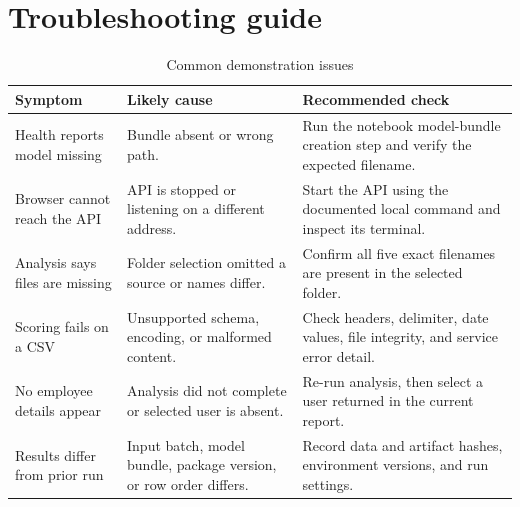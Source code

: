 \section{Troubleshooting guide}
\begin{table}[H]
\centering
\tablefont
\caption{Common demonstration issues}
\label{tab:troubleshooting}
\begin{tabularx}{\textwidth}{|p{}|p{}|Y|}
\hline
\textbf{Symptom} & \textbf{Likely cause} & \textbf{Recommended check}\\\hline
Health reports model missing & Bundle absent or wrong path. & Run the notebook model-bundle creation step and verify the expected filename.\\\hline
Browser cannot reach the API & API is stopped or listening on a different address. & Start the API using the documented local command and inspect its terminal.\\\hline
Analysis says files are missing & Folder selection omitted a source or names differ. & Confirm all five exact filenames are present in the selected folder.\\\hline
Scoring fails on a CSV & Unsupported schema, encoding, or malformed content. & Check headers, delimiter, date values, file integrity, and service error detail.\\\hline
No employee details appear & Analysis did not complete or selected user is absent. & Re-run analysis, then select a user returned in the current report.\\\hline
Results differ from prior run & Input batch, model bundle, package version, or row order differs. & Record data and artifact hashes, environment versions, and run settings.\\\hline
\end{tabularx}
\end{table}

